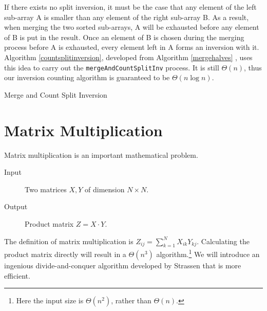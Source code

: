 If there exists no split inversion, it must be the case that any element of the left sub-array A is smaller than any element of the right sub-array B. As a result, when merging the two sorted sub-arrays, A will be exhausted before any element of B is put in the result. Once an element of B is chosen during the merging process before A is exhausted, every element left in A forms an inversion with it. Algorithm \ref{countsplitinversion}, developed from Algorithm \ref{mergehalves}%
, uses this idea to carry out the \texttt{mergeAndCountSplitInv} process. It is still $\Theta(n)$, thus our inversion counting algorithm is guaranteed to be $\Theta(n\log n)$.
\begin{algorithm}[ht]
\caption{Merge and Count Split Inversion}\label{countsplitinversion}
\begin{algorithmic}[1]
\Input
{}
\Output
{}
\Else{}
\EndIf
\EndFor
\end{algorithmic}
\end{algorithm}
\section{Matrix Multiplication}
Matrix multiplication is an important mathematical problem.
\begin{description}
\item[Input]Two matrices $X,Y$ of dimension $N\times N$.
\item[Output]Product matrix $Z=X\cdot Y$.
\end{description}
The definition of matrix multiplication is $Z_{ij}=\sum\limits_{k=1}^NX_{ik}Y_{kj}$. Calculating the product matrix directly will result in a $\Theta(n^3)$ algorithm.\footnote{Here the input size is $\Theta(n^2)$, rather than $\Theta(n)$.} We will introduce an ingenious divide-and-conquer algorithm developed by Strassen that is more efficient.

